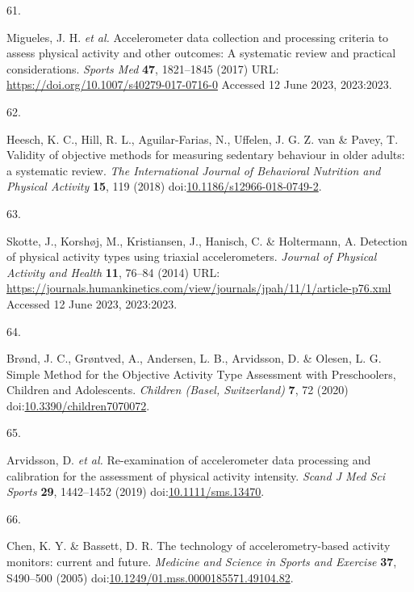 \documentclass[
  10pt,
]{scrbook}
\newlength{\cslhangindent}
\newlength{\csllabelwidth}
\newlength{\cslentryspacingunit} %
\newenvironment{CSLReferences}[2] %
 {%
  \setlength{\parindent}{0pt}
  \ifodd #1
  \let\oldpar\par
  \def\par{\hangindent=\cslhangindent\oldpar}
  \fi
  \setlength{\parskip}{#2\cslentryspacingunit}
 }%
 {}
\newcommand{\CSLLeftMargin}[1]{\parbox[t]{\csllabelwidth}{#1}}
\newcommand{\CSLRightInline}[1]{\parbox[t]{\linewidth - \csllabelwidth}{#1}\break}
\begin{document}
\begin{CSLReferences}{0}{0}
\leavevmode{}%
\CSLLeftMargin{61. }%
\CSLRightInline{Migueles, J. H. \emph{et al.} Accelerometer data
collection and processing criteria to assess physical activity and other
outcomes: A systematic review and practical considerations. \emph{Sports
Med} \textbf{47}, 1821--1845 (2017) URL:
\url{https://doi.org/10.1007/s40279-017-0716-0} Accessed 12 June 2023,
2023:2023.}

\leavevmode{}%
\CSLLeftMargin{62. }%
\CSLRightInline{Heesch, K. C., Hill, R. L., Aguilar-Farias, N., Uffelen,
J. G. Z. van \& Pavey, T. Validity of objective methods for measuring
sedentary behaviour in older adults: a systematic review. \emph{The
International Journal of Behavioral Nutrition and Physical Activity}
\textbf{15}, 119 (2018)
doi:\href{https://doi.org/10.1186/s12966-018-0749-2}{10.1186/s12966-018-0749-2}.}

\leavevmode{}%
\CSLLeftMargin{63. }%
\CSLRightInline{Skotte, J., Korshøj, M., Kristiansen, J., Hanisch, C. \&
Holtermann, A. Detection of physical activity types using triaxial
accelerometers. \emph{Journal of Physical Activity and Health}
\textbf{11}, 76--84 (2014) URL:
\url{https://journals.humankinetics.com/view/journals/jpah/11/1/article-p76.xml}
Accessed 12 June 2023, 2023:2023.}

\leavevmode{}%
\CSLLeftMargin{64. }%
\CSLRightInline{Brønd, J. C., Grøntved, A., Andersen, L. B., Arvidsson,
D. \& Olesen, L. G. Simple Method for the Objective Activity Type
Assessment with Preschoolers, Children and Adolescents. \emph{Children
(Basel, Switzerland)} \textbf{7}, 72 (2020)
doi:\href{https://doi.org/10.3390/children7070072}{10.3390/children7070072}.}

\leavevmode{}%
\CSLLeftMargin{65. }%
\CSLRightInline{Arvidsson, D. \emph{et al.} Re-examination of
accelerometer data processing and calibration for the assessment of
physical activity intensity. \emph{Scand J Med Sci Sports} \textbf{29},
1442--1452 (2019)
doi:\href{https://doi.org/10.1111/sms.13470}{10.1111/sms.13470}.}

\leavevmode{}%
\CSLLeftMargin{66. }%
\CSLRightInline{Chen, K. Y. \& Bassett, D. R. The technology of
accelerometry-based activity monitors: current and future.
\emph{Medicine and Science in Sports and Exercise} \textbf{37},
S490--500 (2005)
doi:\href{https://doi.org/10.1249/01.mss.0000185571.49104.82}{10.1249/01.mss.0000185571.49104.82}.}


\end{CSLReferences}
\end{document}
